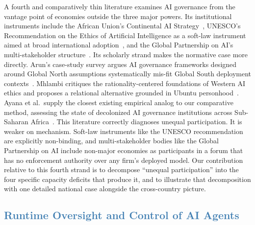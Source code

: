 \documentclass[journal]{IEEEtran}
\begin{document}
A fourth and comparatively thin literature examines AI governance from the vantage point of economies outside the three major powers. Its institutional instruments include the African Union's Continental AI Strategy~\cite{au2024continentalai},
UNESCO's Recommendation on the Ethics of Artificial Intelligence as a soft-law instrument aimed at broad international adoption~\cite{unesco2021recommendation},
and the Global Partnership on AI's multi-stakeholder structure~\cite{gpai2024oecd}.
Its scholarly strand makes the normative case more directly. Arun's case-study survey argues AI governance frameworks designed around Global North assumptions systematically mis-fit Global South deployment contexts~\cite{arun2020ai}. Mhlambi critiques the rationality-centered foundations of Western AI ethics and proposes a relational alternative grounded in Ubuntu personhood~\cite{mhlambi2020rationality}. Ayana et al.\ supply the closest existing empirical analog to our comparative method, assessing the state of decolonized AI governance institutions across Sub-Saharan Africa~\cite{ayana2024decolonizing}.
This literature correctly diagnoses unequal participation. It is weaker on mechanism. Soft-law instruments like the UNESCO recommendation are explicitly non-binding, and multi-stakeholder bodies like the Global Partnership on AI include non-major economies as participants in a forum that has no enforcement authority over any firm's deployed model. Our contribution relative to this fourth strand is to decompose ``unequal participation'' into the four specific capacity deficits that produce it, and to illustrate that decomposition with one detailed national case alongside the cross-country picture.

\subsection{\textcolor{steelblue}{Runtime Oversight and Control of AI Agents}}
\label{sec:related-runtime}
\end{document}
